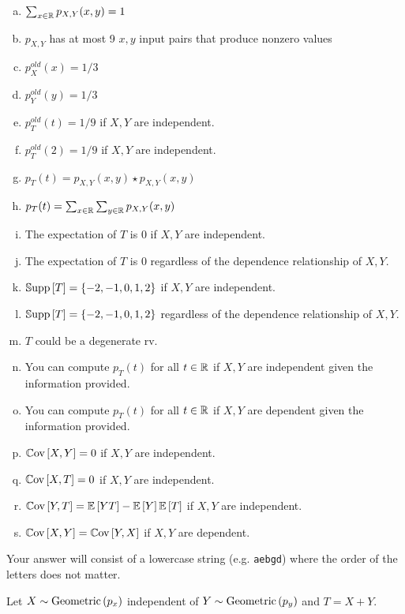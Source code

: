 \documentclass[12pt,landscape]{article}
\newcommand{\instr}{\small Your answer will consist of a lowercase string (e.g. \texttt{aebgd}) where the order of the letters does not matter. \normalsize}
\begin{document}
\begin{enumerate}[(a)]
\item $\sum_{x \in \mathbb{R}} p_{X,Y}(x,y) = 1$
\item $p_{X,Y}$ has at most 9 $x,y$ input pairs that produce nonzero values
\item $p_X^{old}(x) = 1/3$
\item $p_Y^{old}(y) = 1/3$
\item $p_T^{old}(t) = 1/9$ if $X,Y$ are independent.
\item $p_T^{old}(2) = 1/9$ if $X,Y$ are independent.
\item $p_T(t) = p_{X,Y}(x,y) \star p_{X,Y}(x,y)$
\item $p_T(t) = \sum_{x \in \mathbb{R}} \sum_{y \in \mathbb{R}} p_{X,Y}(x,y)$
\item The expectation of $T$ is 0 if $X,Y$ are independent.
\item The expectation of $T$ is 0 regardless of the dependence relationship of $X, Y$.
\item $\mathbb{S}\text{upp}\left[T\right] = \left\{-2, -1, 0, 1, 2\right\}$ if $X,Y$ are independent.
\item $\mathbb{S}\text{upp}\left[T\right] = \left\{-2, -1, 0, 1, 2\right\}$ regardless of the dependence relationship of $X, Y$.
\item $T$ could be a degenerate rv.
\item You can compute $p_T(t)$ for all $t \in \mathbb{R}$ if $X,Y$ are independent given the information provided.
\item You can compute $p_T(t)$ for all $t \in \mathbb{R}$ if $X,Y$ are dependent given the information provided.
\item $\mathbb{C}\text{ov}\left[X, Y\right] = 0$ if $X,Y$ are independent.
\item $\mathbb{C}\text{ov}\left[X, T\right] = 0$ if $X,Y$ are independent.
\item $\mathbb{C}\text{ov}\left[Y, T\right] = \mathbb{E}\left[YT\right] - \mathbb{E}\left[Y\right]\mathbb{E}\left[T\right]$ if $X,Y$ are independent.
\item $\mathbb{C}\text{ov}\left[X, Y\right] = \mathbb{C}\text{ov}\left[Y, X\right]$ if $X,Y$ are dependent.
\end{enumerate}
\eenum\instr\pagebreak

\problem{} Let $X \sim \mathrm{Geometric}\left(p_x\right)$ independent of $Y \sim \mathrm{Geometric}\left(p_y\right)$ and $T = X + Y$.

\vspace{-0.2cm}\benum{} 
\end{document}
